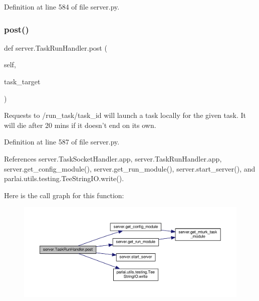 Definition at line 584 of file server.\+py.

\mbox{\label{classserver_1_1TaskRunHandler_aafdad98a65fe99f154621ec74b593d78}} 
\subsubsection{\texorpdfstring{post()}{post()}}
{\footnotesize\ttfamily def server.\+Task\+Run\+Handler.\+post (\begin{DoxyParamCaption}\item[{}]{self,  }\item[{}]{task\+\_\+target }\end{DoxyParamCaption})}

\begin{DoxyVerb}Requests to /run_task/{task_id} will launch a task locally
for the given task. It will die after 20 mins if it doesn't end
on its own.
\end{DoxyVerb}
 

Definition at line 587 of file server.\+py.



References server.\+Task\+Socket\+Handler.\+app, server.\+Task\+Run\+Handler.\+app, server.\+get\+\_\+config\+\_\+module(), server.\+get\+\_\+run\+\_\+module(), server.\+start\+\_\+server(), and parlai.\+utils.\+testing.\+Tee\+String\+I\+O.\+write().

Here is the call graph for this function\+:
\nopagebreak
\begin{figure}[H]
\begin{center}
\leavevmode
\includegraphics[width=350pt]{classserver_1_1TaskRunHandler_aafdad98a65fe99f154621ec74b593d78_cgraph}
\end{center}
\end{figure}


